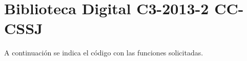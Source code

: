 \section{Biblioteca Digital C3-2013-2 CC-CSSJ}
  A continuación se indica el código con las funciones
  solicitadas.
  
    